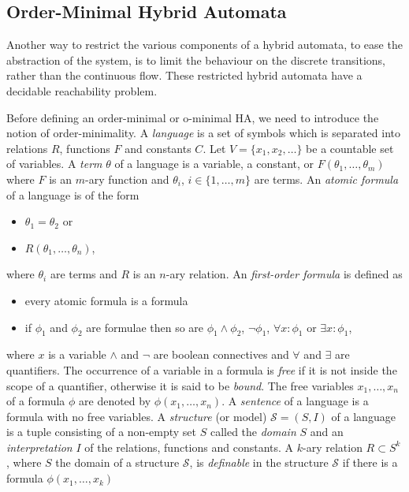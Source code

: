 \subsection{Order-Minimal Hybrid Automata}
Another way to restrict the various components of a hybrid automata, to ease the abstraction of the system, is to limit the behaviour on the discrete transitions, rather than the continuous flow.
These restricted hybrid automata have a decidable reachability problem.

Before defining an order-minimal or o-minimal HA, we need to introduce the notion of order-minimality.
A \emph{language} is a set of symbols which is separated into relations $R$, functions $F$ and constants $C$. Let $V=\{x_{1},x_{2},\ldots\}$ be a countable set of variables.
A \emph{term} $\theta$ of a language is a variable, a constant, or $F(\theta_{1},\ldots,\theta_{m})$ where $F$ is an $m$-ary function and $\theta_{i}$, $i\in\{1,\ldots,m\}$ are terms.
An \emph{atomic formula} of a language is of the form
\begin{itemize}
    \item $\theta_{1}=\theta_{2}$ or
    \item $R(\theta_{1},\ldots,\theta_{n})$,
\end{itemize}
where $\theta_{i}$ are terms and $R$ is an $n$-ary relation.
An \emph{first-order formula} is defined as
\begin{itemize}
    \item every atomic formula is a formula
    \item if $\phi_{1}$ and $\phi_{2}$ are formulae then so are $\phi_{1}\land\phi_{2}$, $\lnot\phi_{1}$, $\forall x : \phi_{1}$ or $\exists x : \phi_{1}$,
\end{itemize}
where $x$ is a variable $\land$ and $\lnot$ are boolean connectives and $\forall$ and $\exists$ are quantifiers.
The occurrence of a variable in a formula is \emph{free} if it is not inside the scope of a quantifier, otherwise it is said to be \emph{bound}. The free variables $x_{1},\ldots,x_{n}$ of a formula $\phi$ are denoted by $\phi(x_{1},\ldots,x_{n})$.
A \emph{sentence} of a language is a formula with no free variables.
A \emph{structure} (or model) $\mathcal{S}=(S,I)$ of a language is a tuple consisting of a non-empty set $S$ called the \emph{domain} $S$ and an \emph{interpretation} $I$ of the relations, functions and constants.
A $k$-ary relation $R\subset S^{k}$, where $S$ the domain of a structure $\mathcal{S}$, is \emph{definable} in the structure $\mathcal{S}$ if there is a formula $\phi(x_{1},\ldots,x_{k})$
